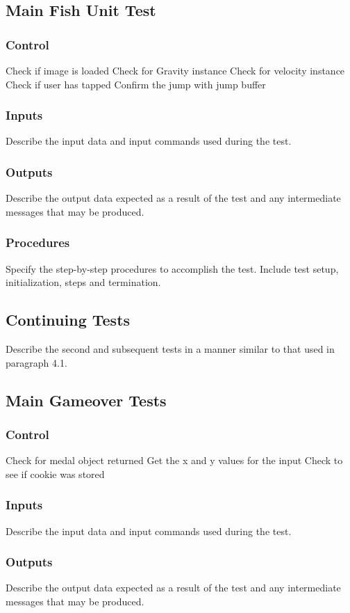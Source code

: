 \documentclass[11pt, oneside]{article}   	%
\begin{document}
\subsection{Main Fish Unit Test}
\subsubsection{Control}
Check if image is loaded
Check for Gravity instance
Check for velocity instance
Check if user has tapped
Confirm the jump with jump buffer

\subsubsection{Inputs}
Describe the input data and input commands used during the test.

\subsubsection{Outputs}
Describe the output data expected as a result of the test and any intermediate messages that may be produced.

\subsubsection{Procedures}
Specify the step-by-step procedures to accomplish the test. Include test setup, initialization, steps and termination.

\subsection{Continuing Tests}
Describe the second and subsequent tests in a manner similar to that used in paragraph 4.1.
\subsection{Main Gameover Tests}
\subsubsection{Control}
Check for medal object returned
Get the x and y values for the input
Check to see if cookie was stored
\subsubsection{Inputs}
Describe the input data and input commands used during the test.

\subsubsection{Outputs}
Describe the output data expected as a result of the test and any intermediate messages that may be produced.
\end{document}

